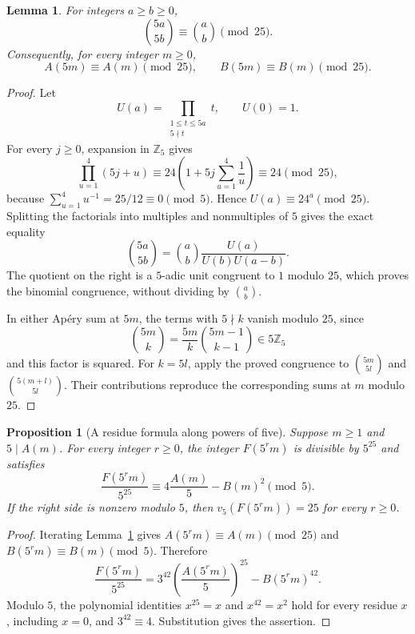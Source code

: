 \documentclass[11pt]{amsart}
\newtheorem{lemma}[theorem]{Lemma}
\newtheorem{proposition}[theorem]{Proposition}
\theoremstyle{definition}
\theoremstyle{remark}
\begin{document}
\begin{lemma}\label{lem:transfer-babbage-five}
For integers $a\ge b\ge0$,
\[
 \binom{5a}{5b}\equiv\binom ab\pmod{25}.
\]
Consequently, for every integer $m\ge0$,
\[
 A(5m)\equiv A(m)\pmod{25},\qquad
 B(5m)\equiv B(m)\pmod{25}.
\]
\end{lemma}
\begin{proof}
Let
\[
 U(a)=\prod_{\substack{1\le t\le5a\\5\nmid t}}t,
 \qquad U(0)=1.
\]
For every $j\ge0$, expansion in $\mathbb Z_5$ gives
\[
 \prod_{u=1}^4(5j+u)
 \equiv24\left(1+5j\sum_{u=1}^4\frac1u\right)
 \equiv24\pmod{25},
\]
because $\sum_{u=1}^4u^{-1}=25/12\equiv0\pmod5$.
Hence $U(a)\equiv24^a\pmod{25}$. Splitting the factorials into multiples
and nonmultiples of $5$ gives the exact equality
\[
 \binom{5a}{5b}
 =\binom ab\frac{U(a)}{U(b)U(a-b)}.
\]
The quotient on the right is a $5$-adic unit congruent to $1$ modulo $25$,
which proves the binomial congruence, without dividing by $\binom ab$.

In either Ap\'ery sum at $5m$, the terms with $5\nmid k$ vanish modulo
$25$, since
\[
 \binom{5m}{k}=\frac{5m}{k}\binom{5m-1}{k-1}\in5\mathbb Z_5
\]
and this factor is squared. For $k=5l$, apply the proved congruence to
$\binom{5m}{5l}$ and $\binom{5(m+l)}{5l}$. Their contributions reproduce
the corresponding sums at $m$ modulo $25$.
\end{proof}

\begin{proposition}[A residue formula along powers of five]
\label{prop:transfer-residue-five}
Suppose $m\ge1$ and $5\mid A(m)$. For every integer $r\ge0$, the integer
$F(5^rm)$ is divisible by $5^{25}$ and satisfies
\[
 \frac{F(5^rm)}{5^{25}}
 \equiv 4\frac{A(m)}5-B(m)^2\pmod5.
\]
If the right side is nonzero modulo $5$, then
$v_5(F(5^rm))=25$ for every $r\ge0$.
\end{proposition}
\begin{proof}
Iterating Lemma~\ref{lem:transfer-babbage-five} gives
$A(5^rm)\equiv A(m)\pmod{25}$ and
$B(5^rm)\equiv B(m)\pmod5$. Therefore
\[
 \frac{F(5^rm)}{5^{25}}
 =3^{42}\left(\frac{A(5^rm)}5\right)^{25}-B(5^rm)^{42}.
\]
Modulo $5$, the polynomial identities $x^{25}=x$ and $x^{42}=x^2$
hold for every residue $x$, including $x=0$, and $3^{42}\equiv4$.
Substitution gives the assertion.
\end{proof}
\end{document}
